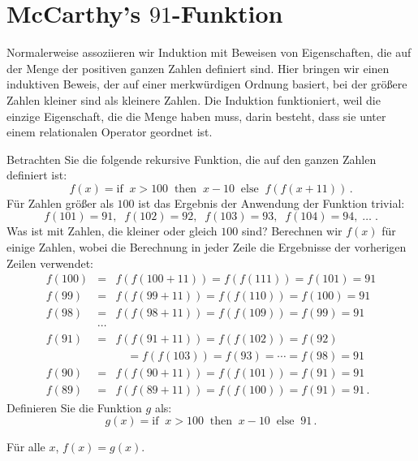 \section{McCarthy's $91$-Funktion}\label{s.induction-mccarthy}

Normalerweise assoziieren wir Induktion mit Beweisen von Eigenschaften, die auf der Menge der positiven ganzen Zahlen definiert sind. Hier bringen wir einen induktiven Beweis, der auf einer merkwürdigen Ordnung basiert, bei der größere Zahlen kleiner sind als kleinere Zahlen. Die Induktion funktioniert, weil die einzige Eigenschaft, die die Menge haben muss, darin besteht, dass sie unter einem relationalen Operator geordnet ist.

Betrachten Sie die folgende rekursive Funktion, die auf den ganzen Zahlen definiert ist:
\[
f(x) = \textrm{if}\;\; x > 100 \;\;\textrm{then}\;\; x - 10 \;\;\textrm{else}\;\; f(f(x+11))\,.
\]
Für Zahlen größer als $100$ ist das Ergebnis der Anwendung der Funktion trivial:
\[
f(101) = 91, \;\; f(102) = 92,\;\; f(103) = 93,\;\; f(104) = 94,\;\ldots\;.
\]
Was ist mit Zahlen, die kleiner oder gleich $100$ sind? Berechnen wir $f(x)$ für einige Zahlen, wobei die Berechnung in jeder Zeile die Ergebnisse der vorherigen Zeilen verwendet:
\begin{eqnarray*}
f(100) &=& f(f(100+11)) = f(f(111)) = f(101) = 91\\
f(99) &=& f(f(99+11)) = f(f(110)) = f(100) = 91\\
f(98) &=& f(f(98+11)) = f(f(109)) = f(99) = 91\\
&\cdots&\\
f(91) &=& f(f(91+11)) = f(f(102)) = f(92)\\
&& \quad = f(f(103)) = f(93) = \cdots =f(98) = 91\\
f(90) &=& f(f(90+11)) = f(f(101)) = f(91) = 91\\
f(89) &=& f(f(89+11)) = f(f(100)) = f(91) = 91\,.
\end{eqnarray*}
Definieren Sie die Funktion $g$ als:
\[
g(x) = \textrm{if}\;\; x > 100 \;\;\textrm{then}\;\; x - 10 \;\;\textrm{else}\;\; 91\,.
\]

\begin{theorem}
Für alle $x$, $f(x) = g(x)$.
\end{theorem}

